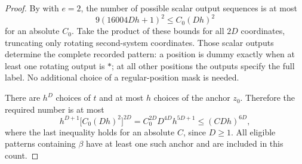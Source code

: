 \begin{proof}
By  with $e=2$, the number of possible scalar
output sequences is at most
\[
 9(16004Dh+1)^2\le C_0(Dh)^2
\]
for an absolute $C_0$. Take the product of these bounds for all $2D$
coordinates, truncating only rotating second-system coordinates.
Those scalar outputs determine the complete recorded pattern: a
position is dummy exactly when at least one rotating output is $*$;
at all other positions the outputs specify the full label. No
additional choice of a regular-position mask is needed.

There are $h^D$ choices of $t$ and at most $h$ choices of the anchor
$z_0$. Therefore the required number is at most
\[
 h^{D+1}\bigl[C_0(Dh)^2\bigr]^{2D}
 =C_0^{2D}D^{4D}h^{5D+1}
 \le(CDh)^{6D},
\]
where the last inequality holds for an absolute $C$, since $D\ge1$.
All eligible patterns containing $\beta$ have at least one such
anchor and are included in this count.
\end{proof}
